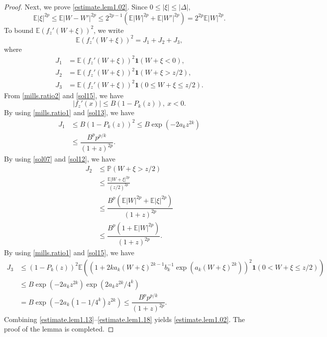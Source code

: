 \documentclass[10pt,a4paper]{amsart}
\def\E{\mathbb{E}}
\def\P{\mathbb{P}}
\begin{document}
\begin{proof}
		Next, we prove \eqref{estimate.lem1.02}. Since $0\le |\xi| \le |\Delta|$,
		\begin{equation}\label{sol12}
			\E|\xi|^{2p} \le \E|W-W'|^{2p} \le 2^{2p-1} (\E|W|^{2p}+\E|W'|^{2p})=2^{2p}\E|W|^{2p}.
		\end{equation}
		To bound $\E(f_{z}'(W+\xi))^2$, we write 
		\begin{equation}\label{estimate.lem1.13}
			\E(f_{z}'(W+\xi))^2 =J_1+J_2+J_3,
		\end{equation}
		where
		\begin{equation*}
			\begin{split}
				J_1&=\E (f_{z}'(W+\xi))^2\mathbf{1}(W+\xi< 0),\\
				J_2&=\E (f_{z}'(W+\xi))^2\mathbf{1}(W+\xi>z/2),\\
				J_3&=\E (f_{z}'(W+\xi))^2\mathbf{1}(0\le W+\xi\le z/2).
			\end{split}
		\end{equation*}
		From  \eqref{mills.ratio2} and \eqref{sol15}, we have  
		\begin{equation}\label{sol13}
			|f_{z}'(x)| \le B(1-P_k(z)),\ x<0.
		\end{equation}
		By using \eqref{mills.ratio1} and \eqref{sol13}, we have
		\begin{equation}\label{estimate.lem1.15}
			\begin{split}
				J_1&\le B(1-P_k(z))^2 \le B\exp \left(-2a_k z^{2 k}\right)\\
				&\le \dfrac{B^pp^{p/k}}{(1+z)^{2p}}.
			\end{split} 
		\end{equation}
		By using \eqref{sol07} and \eqref{sol12}, we have
		\begin{equation}\label{estimate.lem1.17}
			\begin{split}
				J_2&\le \P(W+\xi>z/2)\\
				&\le \frac{\E|W+\xi|^{2p}}{(z/2)^{2p}}\\
				&\le \dfrac{B^p(\E|W|^{2p}+\E|\xi|^{2p})}{(1+z)^{2p}} \\
				&\le \dfrac{B^p(1+\E|W|^{2p})}{(1+z)^{2p}}.
			\end{split} 
		\end{equation}
		By using \eqref{mills.ratio1}  and \eqref{sol15}, we have
		\begin{equation}\label{estimate.lem1.18}
			\begin{split}
				J_3&\le (1-P_k(z))^2\E \left(  ( 1 + 2ka_k(W+\xi)^{2k-1}b_k^{-1}\exp({a_k(W+\xi)^{2k}})  )^2\mathbf{1}(0 < W+\xi \le z/2)\right)\\
				&\le B \exp\left(-2a_kz^{2k}\right)\exp\left(2a_kz^{2k}/4^k\right)\\
				&=B\exp\left(-2a_k(1-1/4^k)z^{2k}\right)\le  \dfrac{B^{p}p^{p/k}}{(1+z)^{2p}}.
			\end{split} 
		\end{equation}
		Combining \eqref{estimate.lem1.13}--\eqref{estimate.lem1.18} yields \eqref{estimate.lem1.02}.
		The proof of the lemma is completed.
	\end{proof}
\end{document}

